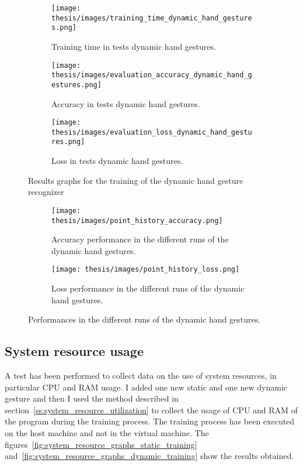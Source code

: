 \documentclass[../thesis.tex]{subfiles}
\begin{document}
\begin{figure}[H]
     \centering
     \begin{subfigure}[b]{0.45\textwidth}
         \centering
         \texttt{[image: thesis/images/training\_time\_dynamic\_hand\_gestures.png]}
         \caption{Training time in tests dynamic hand gestures.}
         \label{fig:training_time_dynamic_hand_gestures}
     \end{subfigure}
     \hfill
     \begin{subfigure}[b]{0.45\textwidth}
         \centering
         \texttt{[image: thesis/images/evaluation\_accuracy\_dynamic\_hand\_gestures.png]}
         \caption{Accuracy in tests dynamic hand gestures.}
         \label{fig:evaluation_accuracy_dynamic_hand_gestures}
     \end{subfigure}
     \hfill
     \begin{subfigure}[b]{0.45\textwidth}
         \centering
         \texttt{[image: thesis/images/evaluation\_loss\_dynamic\_hand\_gestures.png]}
         \caption{Loss in tests dynamic hand gestures.}
         \label{fig:evaluation_loss_dynamic_hand_gestures.}
     \end{subfigure}
        \caption{Results graphs for the training of the dynamic hand gesture recognizer}
        \label{fig:results_graphs_dynamic_hand_gestures}
\end{figure}

\begin{figure}[H]
\centering
\begin{subfigure}[b]{\textwidth}
    \centering
    \texttt{[image: thesis/images/point\_history\_accuracy.png]}
    \caption{Accuracy performance in the different runs of the dynamic hand gestures.}
    \label{fig:accuracy_performance_dynamic_hand_gestures}
\end{subfigure}
\hfill
\begin{subfigure}[b]{\textwidth}
    \centering
    \texttt{[image: thesis/images/point\_history\_loss.png]}
    \caption{Loss performance in the different runs of the dynamic hand gestures.}
    \label{fig:loss_performance_dynamic_hand_gestures}
\end{subfigure}
\caption{Performances in the different runs of the dynamic hand gestures.}
\label{fig:performances_dynamic_hand_gestures}
\end{figure}

\subsection{System resource usage}\label{ss:system_resource_usage_training}
A test has been performed to collect data on the use of system resources, in particular CPU and RAM usage. I added one new static and one new dynamic gesture and then I used the method described in section~\ref{ss:system_resource_utilization} to collect the usage of CPU and RAM of the program during the training process. The training process has been executed on the host machine and not in the virtual machine. The figures~\ref{fig:system_resource_graphs_static_training} and~\ref{fig:system_resource_graphs_dynamic_training} show the results obtained.
\end{document}
